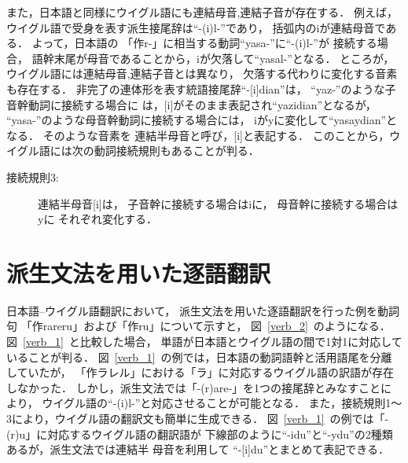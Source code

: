 また，日本語と同様にウイグル語にも連結母音,連結子音が存在する．
例えば，ウイグル語で受身を表す派生接尾辞は``-(i)l-''であり，
括弧内のiが連結母音である．
よって，日本語の\linebreak
「作r-」に相当する動詞``yasa-''に``-(i)l-''が
接続する場合，
語幹末尾が母音であることから，iが欠落して``yasal-''となる．
ところが，ウイグル語には連結母音,連結子音とは異なり，
欠落する代わりに変化する音素も存在する．
非完了の連体形を表す統語接尾辞``-[i]di\mg an''は，
``yaz-''のような子音幹動詞に接続する場合に
は，[i]がそのまま表記され``yazidi\mg an''となるが，
``yasa-''のような母音幹動詞に接続する場合には，
iがyに変化して``yasaydi\mg an''となる．
そのような音素を
{\dg 連結半母音}と呼び，[i]と表記する．
このことから，ウイグル語には次の動詞接続規則もあることが判る．
\begin{description}
\item[接続規則3:]
連結半母音[i]は，
子音幹に接続する場合はiに，
母音幹に接続する場合はyに
それぞれ変化する．
\end{description}

\section{派生文法を用いた逐語翻訳}
日本語--ウイグル語翻訳において，
派生文法を用いた逐語翻訳を行った例を動詞句
「作rareru」および「作ru」について示すと，
図~\ref{verb_2}~のようになる．
図~\ref{verb_1}~と比較した場合，
単語が日本語とウイグル語の間で1対1に対応していることが判る．
図~\ref{verb_1}~の例では，日本語の動詞語幹と活用語尾を分離していたが，
「作ラレル」における「ラ」に対応するウイグル語の訳語が存在しなかった．
しかし，派生文法では「-(r)are-」を1つの接尾辞とみなすことにより，
ウイグル語の``-(i)l-''と対応させることが可能となる．
また，接続規則1〜3により，ウイグル語の翻訳文も簡単に生成できる．
図~\ref{verb_1}~の例では「-(r)u」に対応するウイグル語の翻訳語が
下線部のように``-idu''と``-ydu''の2種類あるが，派生文法では連結半
母音を利用して
``-[i]du''とまとめて表記できる．

